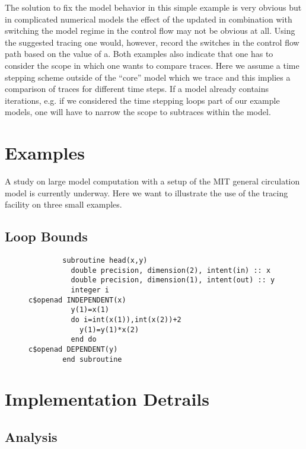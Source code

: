 \documentclass{article}
\begin{document}
The solution to fix the model behavior in this simple example is very obvious
but in complicated numerical models the effect of the updated in combination with 
switching the model regime in the control flow may not be obvious at all. 
Using the suggested tracing one would, however, record the switches in 
the control flow path based on the value of a. 
Both examples also indicate that one has to consider the  scope in which 
one wants to compare traces. Here we assume a time stepping scheme 
outside of the ``core'' model which we trace and this implies a comparison 
of traces for different time steps.  
If a model already contains iterations, e.g. if we considered the time stepping 
loops part of our example models, one will have to narrow the scope to 
subtraces within the model. 
 

    


\section{Examples}
A study on large model computation with  a setup of the MIT general circulation model 
is currently underway.  
Here we want to illustrate the use of the tracing facility on three small examples.
\subsection{Loop Bounds}
\begin{figure}
\begin{lstlisting}
        subroutine head(x,y)
          double precision, dimension(2), intent(in) :: x
          double precision, dimension(1), intent(out) :: y
          integer i
c$openad INDEPENDENT(x)
          y(1)=x(1) 
          do i=int(x(1)),int(x(2))+2
            y(1)=y(1)*x(2)
          end do
c$openad DEPENDENT(y)
        end subroutine
\end{lstlisting}
\end{figure} 
 	

\section{Implementation Detrails}\label{sec:implementation}
\subsection{Analysis}\label{sec:analysis}
  
\end{document}
